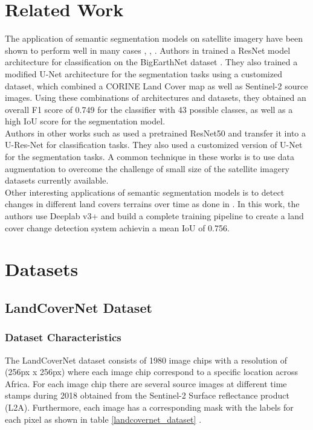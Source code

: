 \documentclass[conference]{IEEEtran}
\begin{document}
\section{Related Work}
The application of semantic segmentation models on satellite imagery have been shown to perform well in many cases \cite{DBLP:journals/corr/abs-2003-02899}, \cite{DBLP:journals/corr/abs-2010-06285}, \cite{DBLP:journals/corr/abs-1911-12903}. 
Authors in \cite{DBLP:journals/corr/abs-2003-02899} trained a ResNet model architecture for classification on the BigEarthNet dataset \cite{DBLP:journals/corr/abs-1902-06148}. They also trained a modified U-Net architecture for the segmentation tasks using a customized dataset, which combined a CORINE Land Cover map as well as Sentinel-2 source images. Using these combinations of architectures and datasets, they obtained an overall F1 score of 0.749 for the classifier with 43 possible classes, as well as a high IoU score for the segmentation model. \\ \indent
Authors in other works such as \cite{DBLP:journals/corr/abs-2010-06285} used a pretrained ResNet50 and transfer it into a U-Res-Net for classification tasks. They also used a customized version of U-Net for the segmentation tasks. A common technique in these works is to use data  augmentation to overcome the challenge of small size of the satellite imagery datasets currently available.  \\ \indent
Other interesting applications of semantic segmentation models is to detect changes in different land covers terrains over time as done in \cite{DBLP:journals/corr/abs-1911-12903}. In this work, the authors use Deeplab v3+  \cite{DBLP:journals/corr/ChenPSA17} and build a complete training pipeline to create a land cover change detection system achievin a mean IoU of 0.756.




\section{Datasets}
\subsection{LandCoverNet Dataset}
\subsubsection{Dataset Characteristics}
The LandCoverNet dataset consists of 1980 image chips with a resolution of (256px x 256px) where each image chip correspond to a specific location across Africa. For each image chip there are several source images at different time stamps during 2018  obtained from the Sentinel-2 Surface reflectance product (L2A). Furthermore, each image has a corresponding mask with the labels for each pixel as shown in table \ref{landcovernet_dataset} \cite{DBLP:journals/corr/abs-2012-03111}. 
\end{document}
